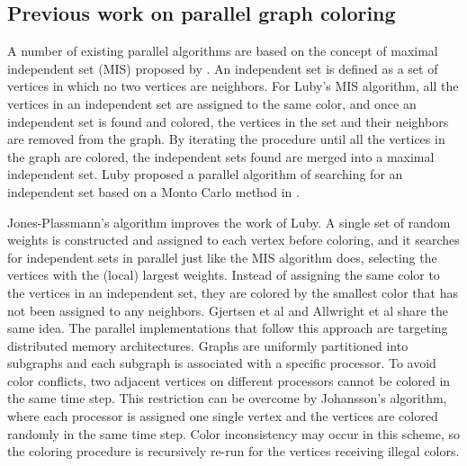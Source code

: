 \documentclass[preprint]{sigplanconf}
\begin{document}
\subsection{Previous work on parallel graph coloring}

A number of existing parallel algorithms are based on the concept of maximal independent set (MIS) proposed by \citet{luby1985simple}. An independent set is defined as a set of vertices in which no two vertices are neighbors. For Luby’s MIS algorithm, all the vertices in an independent set are assigned to the same color, and once an independent set is found and colored, the vertices in the set and their neighbors are removed from the graph. By iterating the procedure until all the vertices in the graph are colored, the independent sets found are merged into a maximal independent set. Luby proposed a parallel algorithm of searching for an independent set based on a Monto Carlo method in \cite{luby1985simple}.

Jones-Plassmann’s algorithm \cite{jones1993parallel}  improves the work of Luby. A single set of random weights is constructed and assigned to each vertex before coloring, and it searches for independent sets in parallel just like the MIS algorithm does, selecting the vertices with the (local) largest weights. Instead of assigning the same color to the vertices in an independent set, they are colored by the smallest color that has not been assigned to any neighbors. Gjertsen et al \cite{gjertsen1996parallel} and Allwright et al \cite{allwright1995comparison} share the same idea.  The parallel implementations that follow this approach are targeting distributed memory architectures.  Graphs are uniformly partitioned into subgraphs and each subgraph is associated with a specific processor.  To avoid color conflicts, two adjacent vertices on different processors cannot be colored in the same time step. This restriction can be overcome by Johansson’s algorithm, where each processor is assigned one single vertex and the vertices are colored randomly in the same time step. Color inconsistency may occur in this  scheme, so the coloring procedure is recursively re-run for the vertices receiving illegal colors.
\end{document}
